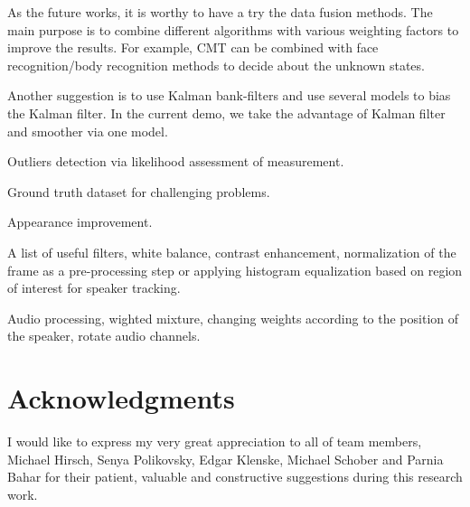 \documentclass[[12pt,DIV14,BCOR12mm,a4paper,footexclude,headinclude,halfparskip-,twoside,openright,cleardoubleempty,idxtotoc,bibtotoc]{article}
\begin{document}
As the future works, it is worthy to have a try the data fusion  methods. The main purpose is to combine different algorithms with various weighting factors to improve the results. For example, CMT can be combined with face recognition/body recognition methods to decide about the unknown states. 


Another suggestion is to use Kalman bank-filters and use several models to bias the Kalman filter. In the current demo, we take the advantage of Kalman filter and smoother via one model.

Outliers detection via likelihood assessment of measurement.

Ground truth dataset for challenging problems.

Appearance improvement.

A list of useful filters, white balance, contrast enhancement, normalization of the frame as a pre-processing step or applying histogram equalization based on region of interest for speaker tracking.

Audio processing, wighted mixture, changing weights according to the position of the speaker, rotate audio channels.



\section{Acknowledgments}

I would like to express my very great appreciation to all of team members, Michael Hirsch, Senya Polikovsky, Edgar Klenske, Michael Schober and Parnia Bahar for their patient, valuable and constructive suggestions during this research work.

\clearpage



\end{document}
